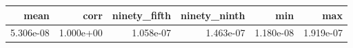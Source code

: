 \begin{tabular}{rrrrrr}
\toprule
mean & corr & ninety_fifth & ninety_ninth & min & max \\
\midrule
5.306e-08 & 1.000e+00 & 1.058e-07 & 1.463e-07 & 1.180e-08 & 1.919e-07 \\
\bottomrule
\end{tabular}
